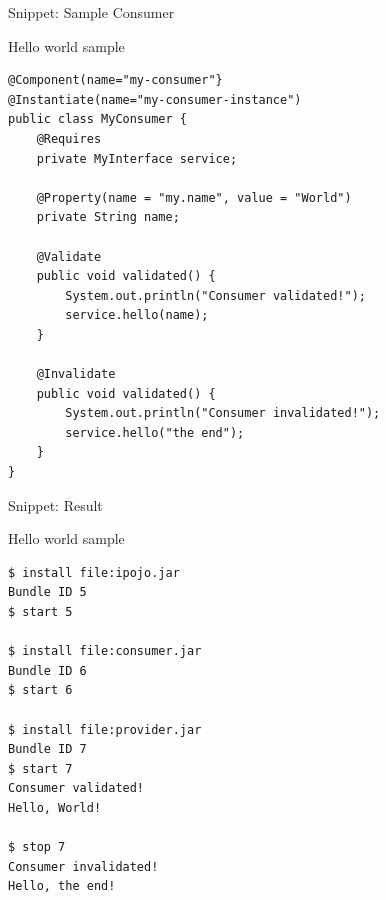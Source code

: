 \begin{frame}[fragile]{Snippet: Sample Consumer}
\begin{block}{Hello world sample}
\begin{verbatim}
@Component(name="my-consumer"}
@Instantiate(name="my-consumer-instance")
public class MyConsumer {
	@Requires
	private MyInterface service;
	
	@Property(name = "my.name", value = "World")
	private String name;
	
	@Validate
	public void validated() {
		System.out.println("Consumer validated!");
		service.hello(name);
	}
	
	@Invalidate
	public void validated() {
		System.out.println("Consumer invalidated!");
		service.hello("the end");
	}
}
\end{verbatim}
\end{block}
\end{frame}

\begin{frame}[fragile]{Snippet: Result}
\begin{block}{Hello world sample}
\begin{verbatim}
$ install file:ipojo.jar
Bundle ID 5
$ start 5

$ install file:consumer.jar
Bundle ID 6
$ start 6

$ install file:provider.jar
Bundle ID 7
$ start 7
Consumer validated!
Hello, World!

$ stop 7
Consumer invalidated!
Hello, the end!
\end{verbatim}
\end{block}
\end{frame}
